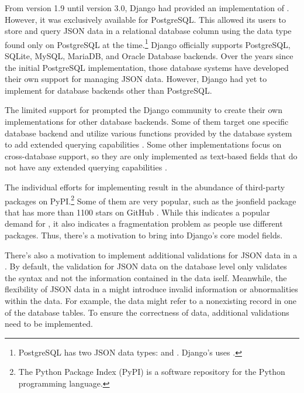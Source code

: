 From version 1.9 until version 3.0, Django had provided an implementation of
. However, it was exclusively available for PostgreSQL. This
 allowed its users to store and query JSON data in a relational
database column using the  data type found only on PostgreSQL at
the time.\footnote{PostgreSQL has two JSON data types:  and
. Django's  uses .} Django officially
supports PostgreSQL, SQLite, MySQL, MariaDB, and Oracle Database backends. Over
the years since the initial PostgreSQL  implementation, those
database systems have developed their own support for managing JSON data.
However, Django had yet to implement  for database backends
other than PostgreSQL.

The limited support for  prompted the Django community to
create their own  implementations for other database backends.
Some of them target one specific database backend and utilize various functions
provided by the database system to add extended querying capabilities
\cite{mysql_jsonfield, oracle_jsonfield}. Some other implementations
focus on cross-database support, so they are only implemented as text-based
fields that do not have any extended querying capabilities
\cite{ryan_jsonfield}.

The individual efforts for implementing  result in the
abundance of third-party  packages on PyPI.\footnote{The Python
Package Index (PyPI) is a software repository for the Python programming
language.} Some of them are very popular, such as the \mbox{jsonfield} package
that has more than 1100 stars on GitHub \cite{ryan_jsonfield}. While this
indicates a popular demand for , it also indicates a
fragmentation problem as people use different  packages. Thus,
there's a motivation to bring  into Django's core model fields.

There's also a motivation to implement additional validations for JSON data in
a . By default, the validation for JSON data on the database
level only validates the syntax and not the information contained in the data
iself. Meanwhile, the flexibility of JSON data in a  might
introduce invalid information or abnormalities within the data. For example,
the data might refer to a nonexisting record in one of the database tables. To
ensure the correctness of  data, additional validations need to
be implemented.

